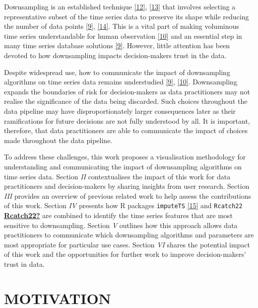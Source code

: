 \documentclass{article}
\begin{document}
Downsampling is an established technique
\protect\hyperlink{ref-downsampling}{{[}12{]}},
\protect\hyperlink{ref-sampling}{{[}13{]}} that involves selecting a
representative subset of the time series data to preserve its shape
while reducing the number of data points
\protect\hyperlink{ref-datapoint}{{[}9{]}},
\protect\hyperlink{ref-MinMaxLTTB}{{[}14{]}}. This is a vital part of
making voluminous time series understandable for human observation
\protect\hyperlink{ref-Sveinn}{{[}10{]}} and an essential step in many
time series database solutions
\protect\hyperlink{ref-datapoint}{{[}9{]}}. However, little attention
has been devoted to how downsampling impacts decision-makers trust in
the data.

Despite widespread use, how to communicate the impact of downsampling
algorithms on time series data remains understudied
\protect\hyperlink{ref-datapoint}{{[}9{]}},
\protect\hyperlink{ref-Sveinn}{{[}10{]}}. Downsampling expands the
boundaries of risk for decision-makers as data practitioners may not
realise the significance of the data being discarded. Such choices
throughout the data pipeline may have disproportionately larger
consequences later as their ramifications for future decisions are not
fully understood by all. It is important, therefore, that data
practitioners are able to communicate the impact of choices made
throughout the data pipeline.

To address these challenges, this work proposes a visualisation
methodology for understanding and communicating the impact of
downsampling algorithms on time series data. Section \emph{II}
contextualises the impact of this work for data practitioners and
decision-makers by sharing insights from user research. Section
\emph{III} provides an overview of previous related work to help assess
the contributions of this work. Section \emph{IV} presents how R
packages \texttt{imputeTS} \protect\hyperlink{ref-imputeTS_R}{{[}15{]}}
and \texttt{Rcatch22}
\protect\hyperlink{ref-Rcatch22}{\textbf{Rcatch22?}} are combined to
identify the time series features that are most sensitive to
downsampling. Section \emph{V} outlines how this approach allows data
practitioners to communicate which downsampling algorithms and
parameters are most appropriate for particular use cases. Section
\emph{VI} shares the potential impact of this work and the opportunities
for further work to improve decision-makers' trust in data.

\hypertarget{motivation}{%
\section{MOTIVATION}\label{motivation}}
\end{document}
